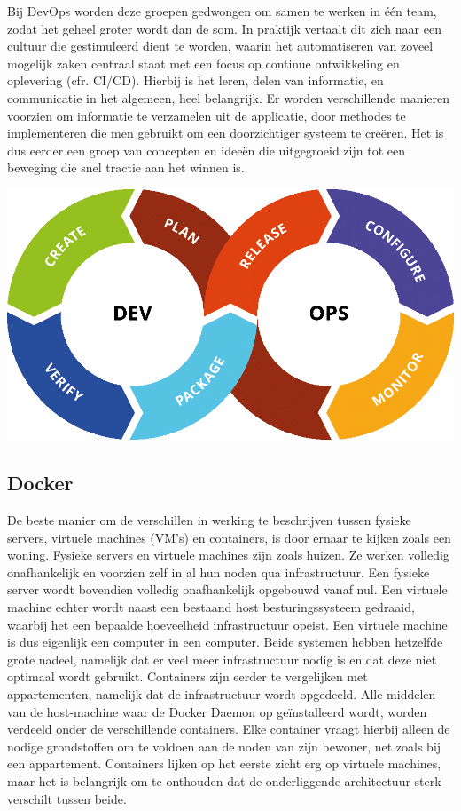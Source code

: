 Bij DevOps worden deze groepen gedwongen om samen te werken in één team, zodat het geheel groter wordt dan de som. In praktijk vertaalt dit zich naar een cultuur die gestimuleerd dient te worden, waarin het automatiseren van zoveel mogelijk zaken centraal staat met een focus op continue ontwikkeling en oplevering (cfr. CI/CD). Hierbij is het leren, delen van informatie, en communicatie in het algemeen, heel belangrijk. Er worden verschillende manieren voorzien om informatie te verzamelen uit de applicatie, door methodes te implementeren die men gebruikt om een doorzichtiger systeem te creëren. Het is dus eerder een groep van concepten en ideeën die uitgegroeid zijn tot een beweging die snel tractie aan het winnen is.

\begin{center}
\includegraphics[scale=0.5]{img/devops.png}
\end{center}

\subsection{Docker}
\label{sec:docker-uitleg}
De beste manier om de verschillen in werking te beschrijven tussen fysieke servers, virtuele machines (VM’s) en containers, is door ernaar te kijken zoals een woning. Fysieke servers en virtuele machines zijn zoals huizen. Ze werken volledig onafhankelijk en voorzien zelf in al hun noden qua infrastructuur. Een fysieke server wordt bovendien volledig onafhankelijk opgebouwd vanaf nul. Een virtuele machine echter wordt naast een bestaand host besturingssysteem gedraaid, waarbij het een bepaalde hoeveelheid infrastructuur opeist. Een virtuele machine is dus eigenlijk een computer in een computer. Beide systemen hebben hetzelfde grote nadeel, namelijk dat er veel meer infrastructuur nodig is en dat deze niet optimaal wordt gebruikt. Containers zijn eerder te vergelijken met appartementen, namelijk dat de infrastructuur wordt opgedeeld. Alle middelen van de host-machine waar de Docker Daemon op geïnstalleerd wordt, worden verdeeld onder de verschillende containers. Elke container vraagt hierbij alleen de nodige grondstoffen om te voldoen aan de noden van zijn bewoner, net zoals bij een appartement. Containers lijken op het eerste zicht erg op virtuele machines, maar het is belangrijk om te onthouden dat de onderliggende architectuur sterk verschilt tussen beide.

